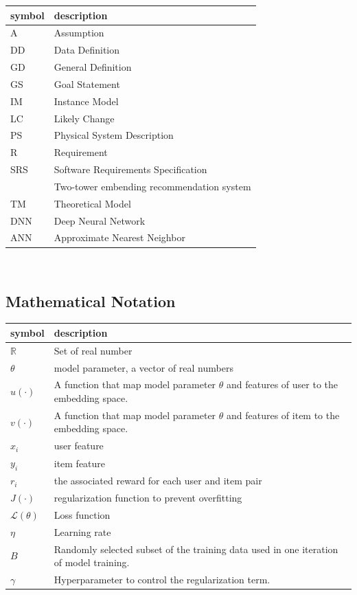 \documentclass[12pt]{article}
\begin{document}
\renewcommand{\arraystretch}{1.2}
\begin{tabular}{l l} 
  \toprule		
  \textbf{symbol} & \textbf{description}\\
  \midrule 
  A & Assumption\\
  DD & Data Definition\\
  GD & General Definition\\
  GS & Goal Statement\\
  IM & Instance Model\\
  LC & Likely Change\\
  PS & Physical System Description\\
  R & Requirement\\
  SRS & Software Requirements Specification\\
  \progname{} & Two-tower embending recommendation system\\
  TM & Theoretical Model\\
  DNN & Deep Neural Network\\
  ANN & Approximate Nearest Neighbor\\
  \bottomrule
\end{tabular}\\


\subsection{Mathematical Notation}

\renewcommand{\arraystretch}{1.2}
\begin{tabular}{l l} 
  \toprule		
  \textbf{symbol} & \textbf{description}\\
  \midrule 
  $\mathbb{R}$ & Set of real number\\
  $\theta$ & model parameter, a vector of real numbers\\
  $u(\cdot)$ & A function that map model parameter $\theta$ and features of user to the embedding space.\\
  $v(\cdot)$ & A function that map model parameter $\theta $ and features of item to the embedding space.\\
  $x_i$ & user feature\\
  $y_i$ & item feature\\
  $r_i$ & the associated reward for each user and item pair\\ 
  $J(\cdot)$ & regularization function to prevent overfitting\\
  $\mathcal{L}(\theta)$ & Loss function\\
  $\eta $ & Learning rate\\
  $B $ & Randomly selected subset of the training data used in one iteration of model training.\\
  $\gamma$ & Hyperparameter to control the regularization term. \\
    \bottomrule
\end{tabular}\\
\end{document}
